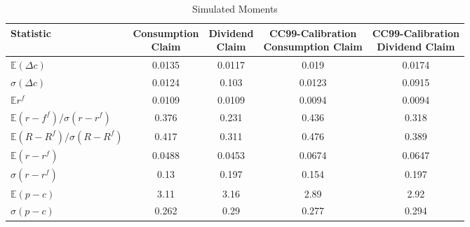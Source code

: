\begin{table}[H]
\centering
\caption{Simulated Moments}
\label{tab:simmom}
\begin{threeparttable}[b]
\begin{adjustbox}{max width=\textwidth}
\begin{tabular}{@{}lcccc@{}}
\toprule
Statistic                                               & \makecell{Consumption \\ Claim} & \makecell{Dividend \\ Claim} & \makecell{CC99-Calibration \\ Consumption Claim} & \makecell{CC99-Calibration\\ Dividend Claim} \\ \midrule
$\mathbb{E}\left(\Delta c \right)$                      &0.0135&0.0117&0.019&0.0174\\
$\sigma\left(\Delta c \right)$                          &0.0124&0.103&0.0123&0.0915\\
$\mathbb{E}r^f$                                         &0.0109&0.0109&0.0094&0.0094\\
$\mathbb{E}\left(r-f^f\right)/\sigma\left(r-r^f\right)$ &0.376&0.231& 0.436                                       &         0.318                            \\
$\mathbb{E}\left(R-R^f\right)/\sigma\left(R-R^f\right)$ & 0.417   & 0.311               &  0.476                                      &      0.389                               \\
$\mathbb{E}\left(r-r^f\right)$                          &  0.0488                 &      0.0453          &         0.0674                               &        0.0647                             \\
$\sigma\left(r-r^f\right)$                              &     0.13              &       0.197           &   0.154                                       &                  0.197                     \\
$\mathbb{E}\left(p-c\right)$                          &     3.11                &      3.16            &         2.89                                 &             2.92                          \\
$\sigma\left(p-c\right)$                              &       0.262            &      0.29          &   0.277                                     & 0.294                                    \\ \bottomrule
\end{tabular}
\end{adjustbox}
\end{threeparttable}
\end{table}

